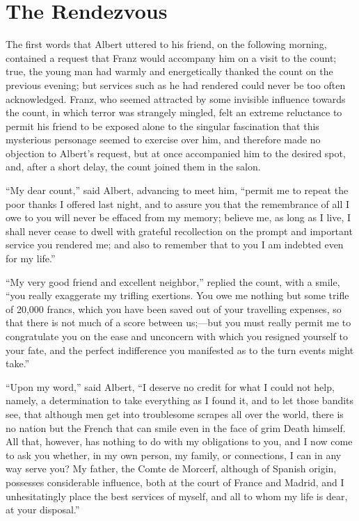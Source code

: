 \chapter{The Rendezvous}

The first words that Albert uttered to his friend, on the following
morning, contained a request that Franz would accompany him on a visit
to the count; true, the young man had warmly and energetically thanked
the count on the previous evening; but services such as he had rendered
could never be too often acknowledged. Franz, who seemed attracted by
some invisible influence towards the count, in which terror was
strangely mingled, felt an extreme reluctance to permit his friend to
be exposed alone to the singular fascination that this mysterious
personage seemed to exercise over him, and therefore made no objection
to Albert’s request, but at once accompanied him to the desired spot,
and, after a short delay, the count joined them in the salon.

“My dear count,” said Albert, advancing to meet him, “permit me to
repeat the poor thanks I offered last night, and to assure you that the
remembrance of all I owe to you will never be effaced from my memory;
believe me, as long as I live, I shall never cease to dwell with
grateful recollection on the prompt and important service you rendered
me; and also to remember that to you I am indebted even for my life.”

“My very good friend and excellent neighbor,” replied the count, with a
smile, “you really exaggerate my trifling exertions. You owe me nothing
but some trifle of 20,000 francs, which you have been saved out of your
travelling expenses, so that there is not much of a score between
us;—but you must really permit me to congratulate you on the ease and
unconcern with which you resigned yourself to your fate, and the
perfect indifference you manifested as to the turn events might take.”

“Upon my word,” said Albert, “I deserve no credit for what I could not
help, namely, a determination to take everything as I found it, and to
let those bandits see, that although men get into troublesome scrapes
all over the world, there is no nation but the French that can smile
even in the face of grim Death himself. All that, however, has nothing
to do with my obligations to you, and I now come to ask you whether, in
my own person, my family, or connections, I can in any way serve you?
My father, the Comte de Morcerf, although of Spanish origin, possesses
considerable influence, both at the court of France and Madrid, and I
unhesitatingly place the best services of myself, and all to whom my
life is dear, at your disposal.”

